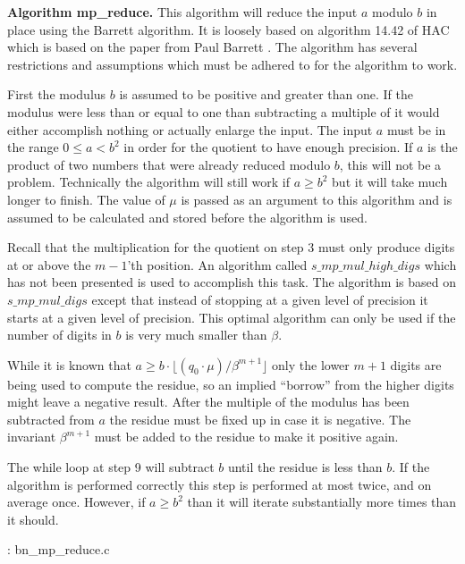 \documentclass[b5paper]{book}
\begin{document}
\textbf{Algorithm mp\_reduce.}
This algorithm will reduce the input $a$ modulo $b$ in place using the Barrett algorithm.  It is loosely based on algorithm 14.42 of HAC
\cite[pp.  602]{HAC} which is based on the paper from Paul Barrett \cite{BARRETT}.  The algorithm has several restrictions and assumptions which must 
be adhered to for the algorithm to work.

First the modulus $b$ is assumed to be positive and greater than one.  If the modulus were less than or equal to one than subtracting
a multiple of it would either accomplish nothing or actually enlarge the input.  The input $a$ must be in the range $0 \le a < b^2$ in order
for the quotient to have enough precision.  If $a$ is the product of two numbers that were already reduced modulo $b$, this will not be a problem.
Technically the algorithm will still work if $a \ge b^2$ but it will take much longer to finish.  The value of $\mu$ is passed as an argument to this 
algorithm and is assumed to be calculated and stored before the algorithm is used.  

Recall that the multiplication for the quotient on step 3 must only produce digits at or above the $m-1$'th position.  An algorithm called 
$s\_mp\_mul\_high\_digs$ which has not been presented is used to accomplish this task.  The algorithm is based on $s\_mp\_mul\_digs$ except that
instead of stopping at a given level of precision it starts at a given level of precision.  This optimal algorithm can only be used if the number
of digits in $b$ is very much smaller than $\beta$.  

While it is known that 
$a \ge b \cdot \lfloor (q_0 \cdot \mu) / \beta^{m+1} \rfloor$ only the lower $m+1$ digits are being used to compute the residue, so an implied 
``borrow'' from the higher digits might leave a negative result.  After the multiple of the modulus has been subtracted from $a$ the residue must be 
fixed up in case it is negative.  The invariant $\beta^{m+1}$ must be added to the residue to make it positive again.  

The while loop at step 9 will subtract $b$ until the residue is less than $b$.  If the algorithm is performed correctly this step is 
performed at most twice, and on average once. However, if $a \ge b^2$ than it will iterate substantially more times than it should.

\vspace{+3mm}\begin{small}
\hspace{-5.1mm}{\bf File}: bn\_mp\_reduce.c
\vspace{-3mm}
\begin{alltt}
\end{alltt}
\end{small}
\end{document}
